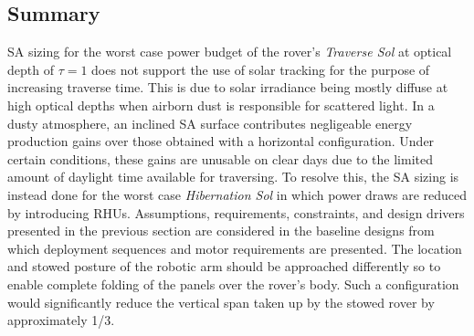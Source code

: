 \subsection{Summary}
\ac{SA} sizing for the worst case power budget of the rover's \textit{Traverse Sol} at optical depth of $\tau = 1$ does not support the use of solar tracking for the purpose of increasing traverse time. This is due to solar irradiance being mostly diffuse at high optical depths when airborn dust is responsible for scattered light. In a dusty atmosphere, an inclined \ac{SA} surface contributes negligeable energy production gains over those obtained with a horizontal configuration. Under certain conditions, these gains are unusable on clear days due to the limited amount of daylight time available for traversing. To resolve this, the \ac{SA} sizing is instead done for the worst case \textit{Hibernation Sol} in which power draws are reduced by introducing \acp{RHU}. Assumptions, requirements, constraints, and design drivers presented in the previous section are considered in the baseline designs from which deployment sequences and motor requirements are presented. The location and stowed posture of the robotic arm should be approached differently so to enable complete folding of the panels over the rover's body. Such a configuration would significantly reduce the vertical span taken up by the stowed rover by approximately 1/3.
